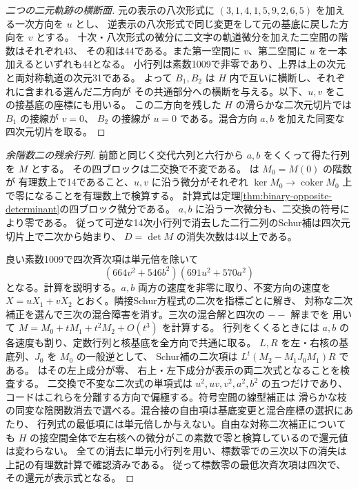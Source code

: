 \begin{proof}[二つの二元軌跡の横断面]
元の表示の八次形式に $(3,1,4,1,5,9,2,6,5)$ を加える一次方向を $u$ とし、
逆表示の八次形式で同じ変更をして元の基底に戻した方向を $v$ とする。
十次・八次形式の微分に二文字の軌道微分を加えた二空間の階数はそれぞれ43、
その和は44である。また第一空間に $v$、第二空間に $u$ を一本加えるといずれも44となる。
小行列は素数1009で非零であり、上界は上の次元と両対称軌道の次元31である。
よって $B_1,B_2$ は $H$ 内で互いに横断し、それぞれに含まれる選んだ二方向が
その共通部分への横断を与える。以下、$u,v$ をこの接基底の座標にも用いる。
この二方向を残した $H$ の滑らかな二次元切片では $B_1$ の接線が $v=0$、
$B_2$ の接線が $u=0$ である。混合方向 $a,b$ を加えた同変な四次元切片を取る。
\end{proof}
\begin{proof}[余階数二の残余行列]
前節と同じく交代六列と六行から $a,b$ をくくって得た行列を $M$ とする。
その四ブロックは二交換で不変である。
は $M_0=M(0)$ の階数が
有理数上で14であること、$u,v$ に沿う微分がそれぞれ
$\ker M_0\to\operatorname{coker}M_0$ 上で零になることを有理数上で検算する。
計算式は定理\ref{thm:binary-opposite-determinant}の四ブロック微分である。
$a,b$ に沿う一次微分も、二交換の符号により零である。
従って可逆な14次小行列で消去した二行二列のSchur補は四次元切片上で二次から始まり、
$D=\det M$ の消失次数は4以上である。

良い素数1009で四次斉次項は単元倍を除いて
\[
               (664v^2+546b^2)(691u^2+570a^2)
\]
となる。計算を説明する。$a,b$ 両方の速度を非零に取り、不変方向の速度を
$X=uX_1+vX_2$ とおく。隣接Schur方程式の二次を指標ごとに解き、
対称な二次補正を選んで三次の混合障害を消す。三次の混合解と四次の $--$ 解までを
用いて $M=M_0+tM_1+t^2M_2+O(t^3)$ を計算する。
行列をくくるときには $a,b$ の各速度も割り、定数行列と核基底を全方向で共通に取る。
$L,R$ を左・右核の基底列、$J_0$ を $M_0$ の一般逆として、
Schur補の二次項は $L^t(M_2-M_1J_0M_1)R$ である。
はその左上成分が零、
右上・左下成分が表示の両二次式となることを検査する。
二交換で不変な二次式の単項式は $u^2,uv,v^2,a^2,b^2$ の五つだけであり、
コードはこれらを分離する方向で偏極する。符号空間の線型補正は
滑らかな枝の同変な陰関数消去で選べる。混合接の自由項は基底変更と混合座標の選択にあたり、
行列式の最低項には単元倍しか与えない。自由な対称二次補正についても
$H$ の接空間全体で左右核への微分がこの素数で零と検算しているので還元値は変わらない。
全ての消去に単元小行列を用い、標数零での三次以下の消失は上記の有理数計算で確認済みである。
従って標数零の最低次斉次項は四次で、その還元が表示式となる。
\end{proof}
